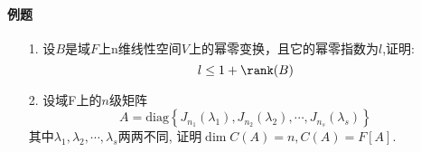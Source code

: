 \paragraph{例题}
\begin{itemize}
  \item[1.] 设$B$是域$F$上n维线性空间$V$上的幂零变换，且它的幂零指数为$l$,证明:
  $$l \le 1 + \rank(B)$$
  \vspace{3cm}
  \item[2.] 设域F上的$n$级矩阵
  $$A = \mathrm{diag}\left\{J_{n_1}(\lambda_1), J_{n_2}(\lambda_2),
  \cdots,J_{n_s}(\lambda_s)\right\}$$
  其中$\lambda_1,\lambda_2,\cdots,\lambda_s$两两不同,
  证明$\dim C(A) = n, C(A) = F[A].$ 
\end{itemize}


